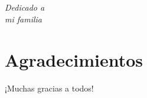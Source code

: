 \documentclass[a4paper,openright,12pt]{report}
\begin{document}
\newpage
\mbox{}
\thispagestyle{empty} %


\chapter*{}
\begin{flushright}
\textit{Dedicado a \\
mi familia}
\end{flushright}


\chapter*{Agradecimientos} %
 
¡Muchas gracias a todos!

\end{document}
